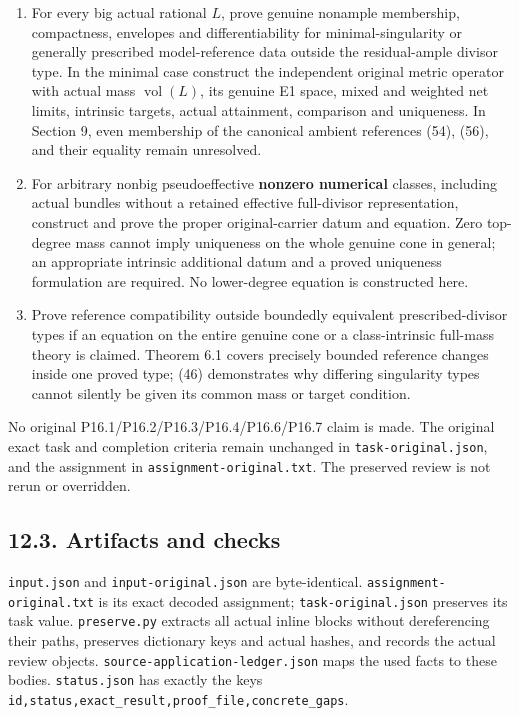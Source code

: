 \documentclass[
  10pt,
]{article}
\providecommand{\tightlist}{%
  \setlength{\itemsep}{0pt}\setlength{\parskip}{0pt}}
\begin{document}
\begin{enumerate}
\def\labelenumi{\arabic{enumi}.}
\tightlist
\item
  For every big actual rational \(L\), prove genuine nonample
  membership, compactness, envelopes and differentiability for
  minimal-singularity or generally prescribed model-reference data
  outside the residual-ample divisor type. In the minimal case construct
  the independent original metric operator with actual mass
  \(\operatorname{vol}(L)\), its genuine E1 space, mixed and weighted
  net limits, intrinsic targets, actual attainment, comparison and
  uniqueness. In Section 9, even membership of the canonical ambient
  references (54), (56), and their equality remain unresolved.
\item
  For arbitrary nonbig pseudoeffective \textbf{nonzero numerical}
  classes, including actual bundles without a retained effective
  full-divisor representation, construct and prove the proper
  original-carrier datum and equation. Zero top-degree mass cannot imply
  uniqueness on the whole genuine cone in general; an appropriate
  intrinsic additional datum and a proved uniqueness formulation are
  required. No lower-degree equation is constructed here.
\item
  Prove reference compatibility outside boundedly equivalent
  prescribed-divisor types if an equation on the entire genuine cone or
  a class-intrinsic full-mass theory is claimed. Theorem 6.1 covers
  precisely bounded reference changes inside one proved type; (46)
  demonstrates why differing singularity types cannot silently be given
  its common mass or target condition.
\end{enumerate}

No original P16.1/P16.2/P16.3/P16.4/P16.6/P16.7 claim is made. The
original exact task and completion criteria remain unchanged in
\texttt{task-original.json}, and the assignment in
\texttt{assignment-original.txt}. The preserved review is not rerun or
overridden.

\subsection{12.3. Artifacts and checks}\label{artifacts-and-checks}

\texttt{input.json} and \texttt{input-original.json} are byte-identical.
\texttt{assignment-original.txt} is its exact decoded assignment;
\texttt{task-original.json} preserves its task value.
\texttt{preserve.py} extracts all actual inline blocks without
dereferencing their paths, preserves dictionary keys and actual hashes,
and records the actual review objects.
\texttt{source-application-ledger.json} maps the used facts to these
bodies. \texttt{status.json} has exactly the keys
\texttt{id,status,exact\_result,proof\_file,concrete\_gaps}.
\end{document}
